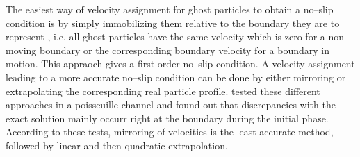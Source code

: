 \documentclass{report}
\begin{document}
The easiest way of velocity assignment for ghost particles to obtain a no--slip condition is by simply immobilizing them relative to the boundary they are to represent \cite{Morris1997}, i.e. all ghost particles have the same velocity which is zero for a non-moving boundary or the corresponding boundary velocity for a boundary in motion. This appraoch gives a first order no--slip condition. A velocity assignment leading to a more accurate no--slip condition can be done by either mirroring or extrapolating the corresponding real particle profile. \cite{Basa2009} tested these different approaches in a poisseuille channel and found out that discrepancies with the exact solution mainly occurr right at the boundary during the initial phase.  According to these tests, mirroring of velocities is the least accurate method, followed by linear and then quadratic extrapolation. 
\end{document}
